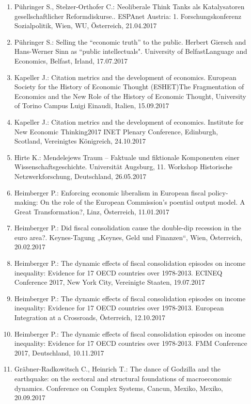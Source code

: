 \begin{enumerate}
	\item Pühringer S., Stelzer-Orthofer C.: Neoliberale Think Tanks als Katalysatoren gesellschaftlicher Reformdiskurse.. ESPAnet Austria: 1. Forschungskonferenz Sozialpolitik, Wien, WU, Österreich, 21.04.2017
	\item Pühringer S.: Selling the “economic truth” to the public. Herbert Giersch and Hans-Werner Sinn as “public intellectuals". University of BelfastLanguage and Economics, Belfast, Irland, 17.07.2017
	\item Kapeller J.: Citation metrics and the development of economics. European Society for the History of Economic Thought (ESHET)The Fragmentation of Economics and the New Role of the History of Economic Thought, University of Torino Campus Luigi Einaudi, Italien, 15.09.2017
	\item Kapeller J.: Citation metrics and the development of economics. Institute for New Economic Thinking2017 INET Plenary Conference, Edinburgh, Scotland, Vereinigtes Königreich, 24.10.2017
	\item Hirte K.: Mendelejews Traum – Faktuale und fiktionale Komponenten einer Wissenschaftsgeschichte. Universität Augsburg, 11. Workshop Historische Netzwerkforschung, Deutschland, 26.05.2017
	\item Heimberger P.: Enforcing economic liberalism in European fiscal policy-making: On the role of the European Commission’s poential output model. A Great Transformation?, Linz, Österreich, 11.01.2017
	\item Heimberger P.: Did fiscal consolidation cause the double-dip recession in the euro area?. Keynes-Tagung „Keynes, Geld und Finanzen“, Wien, Österreich, 20.02.2017
	\item Heimberger P.: The dynamic effects of fiscal consolidation episodes on income inequality: Evidence for 17 OECD countries over 1978-2013. ECINEQ Conference 2017, New York City, Vereinigte Staaten, 19.07.2017
	\item Heimberger P.: The dynamic effects of fiscal consolidation episodes on income inequality: Evidence for 17 OECD countries over 1978-2013. European Integration at a Crossroads, Österreich, 12.10.2017
	\item Heimberger P.: The dynamic effects of fiscal consolidation episodes on income inequality: Evidence for 17 OECD countries over 1978-2013. FMM Conference 2017, Deutschland, 10.11.2017
	\item Gräbner-Radkowitsch C., Heinrich T.: The dance of Godzilla and the earthquake: on the sectoral and structural foundations of macroeconomic dynamics. Conference on Complex Systems, Cancun, Mexiko, Mexiko, 20.09.2017

\end{enumerate}
